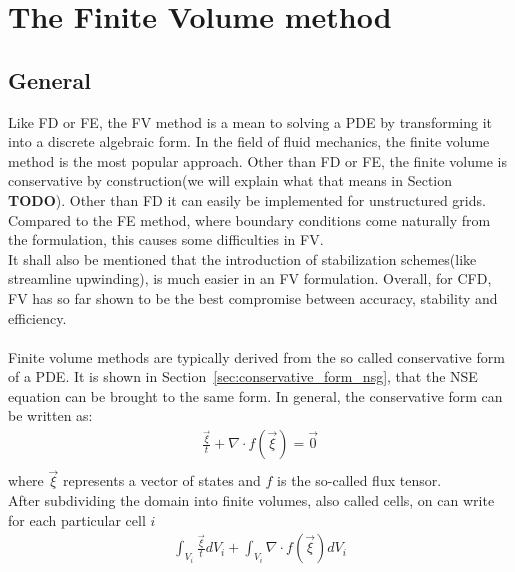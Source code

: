\documentclass[../main.tex]{subfiles}
\begin{document}
\setlength{\delimitershortfall}{0pt}

\section{The Finite Volume method}
\subsection{General}
Like \ac{FD} or \ac{FE}, the \ac{FV} method is a mean to solving a \ac{PDE} by transforming it into a discrete algebraic form. In the field of fluid mechanics, the finite volume method is the most popular approach. Other than \ac{FD} or \ac{FE}, the finite volume is conservative by construction(we will explain what that means in Section \textbf{TODO}). Other than \ac{FD} it can easily be implemented for unstructured grids. Compared to the \ac{FE} method, where boundary conditions come naturally from the formulation, this causes some difficulties in \ac{FV}.\\
It shall also be mentioned that the introduction of stabilization schemes(like streamline upwinding), is much easier in an \ac{FV} formulation.
Overall, for \ac{CFD}, \ac{FV} has so far shown to be the best compromise between accuracy, stability and efficiency.
 \\
 \\
Finite volume methods are typically derived from the so called conservative form of a \ac{PDE}. It is shown in Section~\ref{sec:conservative_form_nsg}, that the \ac{NSE} equation can be  brought to the same form. In general, the conservative form can be written as:
\begin{align}
\tfrac{\vec{\xi}}{t}+\nabla\cdot f(\vec{\xi}) = \vec{0} \\
\end{align}
where $\vec{\xi}$ represents a vector of states and $f$ is the so-called flux tensor.\\
After subdividing the domain into finite volumes, also called cells, on can write for each particular cell $i$
\begin{align}
\int_{V_i} \tfrac{\vec{\xi}}{t} dV_i + \int_{V_i} \nabla\cdot f(\vec{\xi}) dV_i
\end{align}
\end{document}
